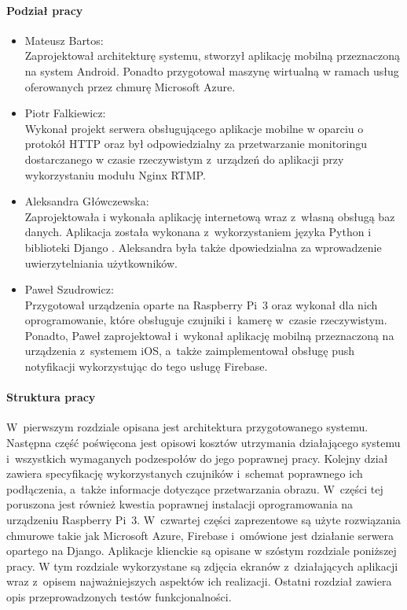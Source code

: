 \paragraph{Podział pracy}
\begin{itemize}
\item Mateusz Bartos: \\
Zaprojektował architekturę systemu, stworzył aplikację mobilną przeznaczoną na system Android. Ponadto przygotował maszynę wirtualną w ramach usług oferowanych przez chmurę Microsoft Azure.
\item Piotr Falkiewicz: \\
Wykonał projekt serwera obsługującego aplikacje mobilne w oparciu o protokół HTTP oraz był odpowiedzialny za przetwarzanie monitoringu dostarczanego w czasie rzeczywistym z~urządzeń do aplikacji przy wykorzystaniu modułu Nginx RTMP.
\item Aleksandra Główczewska: \\
Zaprojektowała i wykonała aplikację internetową wraz z~własną obsługą baz danych. Aplikacja została wykonana z~wykorzystaniem języka Python i biblioteki Django \cite{djangoREST}. Aleksandra była także dpowiedzialna za wprowadzenie uwierzytelniania użytkowników.
\item Paweł Szudrowicz: \\
Przygotował urządzenia oparte na Raspberry Pi~3 oraz wykonał dla nich oprogramowanie, które obsługuje czujniki i~kamerę w~czasie rzeczywistym. Ponadto, Paweł zaprojektował i~wykonał aplikację mobilną przeznaczoną na urządzenia z~systemem iOS, a~także zaimplementował obsługę push notyfikacji wykorzystując do tego usługę Firebase.
\end{itemize}

\paragraph{Struktura pracy}
W~pierwszym rozdziale opisana jest architektura przygotowanego systemu. Następna część poświęcona jest opisowi kosztów utrzymania działającego systemu i~wszystkich wymaganych podzespołów do jego poprawnej pracy. Kolejny dział zawiera specyfikację wykorzystanych czujników i~schemat poprawnego ich podłączenia, a~także informacje dotyczące przetwarzania obrazu. W~części tej poruszona jest również kwestia poprawnej instalacji oprogramowania na urządzeniu Raspberry Pi~3.  W~czwartej części zaprezentowe są użyte rozwiązania chmurowe takie jak Microsoft Azure, Firebase i~omówione jest działanie serwera opartego na Django. Aplikacje klienckie są opisane w szóstym rozdziale poniższej pracy. W tym rozdziale wykorzystane są zdjęcia ekranów z~działających aplikacji wraz z~opisem najważniejszych aspektów ich realizacji. Ostatni rozdział zawiera opis przeprowadzonych testów funkcjonalności.
